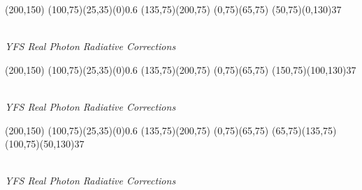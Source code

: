 \documentclass{article}
\begin{document}
\begin{center}
	\begin{axopicture}(200,150)
		\GOval(100,75)(25,35)(0){0.6}
		\Line[arrow](135,75)(200,75)
		\Line[arrow](0,75)(65,75)
		\Photon(50,75)(0,130){3}{7}
	\end{axopicture}
	\\ {\sl YFS Real Photon Radiative Corrections}
\end{center}  

\begin{center}
	\begin{axopicture}(200,150)
		\GOval(100,75)(25,35)(0){0.6}
		\Line[arrow](135,75)(200,75)
		\Line[arrow](0,75)(65,75)
		\Photon(150,75)(100,130){3}{7}
	\end{axopicture}
	\\ {\sl YFS Real Photon Radiative Corrections}
\end{center}  

\begin{center}
	\begin{axopicture}(200,150)
		\GOval(100,75)(25,35)(0){0.6}
		\Line[arrow](135,75)(200,75)
		\Line[arrow](0,75)(65,75)
		\Line(65,75)(135,75)
		\Photon(100,75)(50,130){3}{7}
	\end{axopicture}
	\\ {\sl YFS Real Photon Radiative Corrections}
\end{center}  

	
\end{document}
